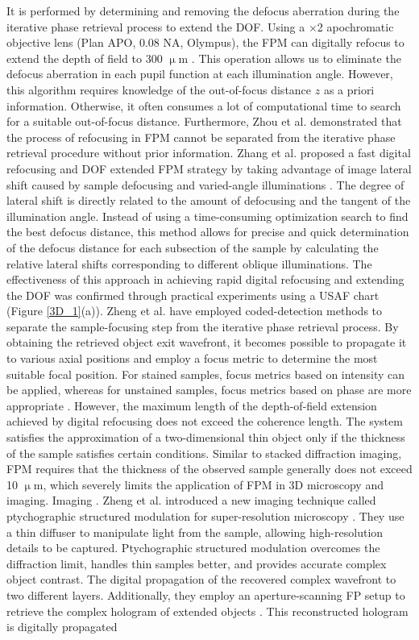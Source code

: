 \documentclass[journal,review,submit,pdftex,moreauthors]{Definitions/mdpi}
\begin{document}
It is performed by determining and removing the defocus aberration during the iterative phase retrieval process to extend the DOF. Using a ×2 apochromatic objective lens (Plan APO, 0.08 NA, Olympus), the FPM can digitally refocus to extend the depth of field to 300 $\upmu$m \cite{zheng2013wide}. This operation allows us to eliminate the defocus aberration in each pupil function at each illumination angle. However, this algorithm requires knowledge of the out-of-focus distance $z$ as a priori information. Otherwise, it often consumes a lot of computational time to search for a suitable out-of-focus distance.  Furthermore, Zhou et al. demonstrated that the process of refocusing in FPM cannot be separated from the iterative phase retrieval procedure without prior information\cite{zhou2022analysis}. Zhang et al. proposed a fast digital refocusing and DOF extended FPM strategy by taking advantage of image lateral shift caused by sample defocusing and varied-angle illuminations \cite{zhang2021fast}. The degree of lateral shift is directly related to the amount of defocusing and the tangent of the illumination angle. Instead of using a time-consuming optimization search to find the best defocus distance, this method allows for precise and quick determination of the defocus distance for each subsection of the sample by calculating the relative lateral shifts corresponding to different oblique illuminations. The effectiveness of this approach in achieving rapid digital refocusing and extending the DOF was confirmed through practical experiments using a USAF chart (Figure \ref{3D_1}(a)). Zheng et al. have employed coded-detection methods to separate the sample-focusing step from the iterative phase retrieval process. By obtaining the retrieved object exit wavefront, it becomes possible to propagate it to various axial positions and employ a focus metric to determine the most suitable focal position. For stained samples, focus metrics based on intensity can be applied, whereas for unstained samples, focus metrics based on phase are more appropriate \cite {guo2021deep, guo2020openwsi, jiang2022high}. However, the maximum length of the depth-of-field extension achieved by digital refocusing does not exceed the coherence length. The system satisfies the approximation of a two-dimensional thin object only if the thickness of the sample satisfies certain conditions\cite{ lee2013synthetic}. Similar to stacked diffraction imaging, FPM requires that the thickness of the observed sample generally does not exceed 10 $\upmu$m, which severely limits the application of FPM in 3D microscopy and imaging. Imaging \cite{ liu2009influence}. Zheng et al. introduced a new imaging technique called ptychographic structured modulation for super-resolution microscopy \cite{song2019super}. They use a thin diffuser to manipulate light from the sample, allowing high-resolution details to be captured. Ptychographic structured modulation overcomes the diffraction limit, handles thin samples better, and provides accurate complex object contrast. The digital propagation of the recovered complex wavefront to two different layers. Additionally, they employ an aperture-scanning FP setup to retrieve the complex hologram of extended objects \cite{dong2014aperture}. This reconstructed hologram is digitally propagated 
\end{document}
